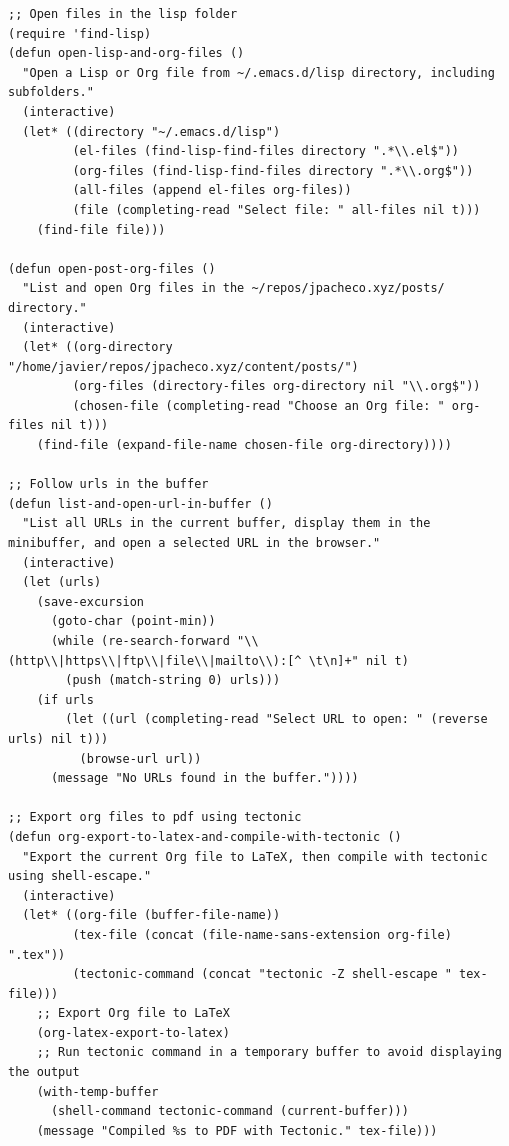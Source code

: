 \documentclass[11pt]{article}
\begin{document}
\begin{verbatim}
;; Open files in the lisp folder
(require 'find-lisp)
(defun open-lisp-and-org-files ()
  "Open a Lisp or Org file from ~/.emacs.d/lisp directory, including subfolders."
  (interactive)
  (let* ((directory "~/.emacs.d/lisp")
         (el-files (find-lisp-find-files directory ".*\\.el$"))
         (org-files (find-lisp-find-files directory ".*\\.org$"))
         (all-files (append el-files org-files))
         (file (completing-read "Select file: " all-files nil t)))
    (find-file file)))

(defun open-post-org-files ()
  "List and open Org files in the ~/repos/jpacheco.xyz/posts/ directory."
  (interactive)
  (let* ((org-directory "/home/javier/repos/jpacheco.xyz/content/posts/")
         (org-files (directory-files org-directory nil "\\.org$"))
         (chosen-file (completing-read "Choose an Org file: " org-files nil t)))
    (find-file (expand-file-name chosen-file org-directory))))

;; Follow urls in the buffer
(defun list-and-open-url-in-buffer ()
  "List all URLs in the current buffer, display them in the minibuffer, and open a selected URL in the browser."
  (interactive)
  (let (urls)
    (save-excursion
      (goto-char (point-min))
      (while (re-search-forward "\\(http\\|https\\|ftp\\|file\\|mailto\\):[^ \t\n]+" nil t)
        (push (match-string 0) urls)))
    (if urls
        (let ((url (completing-read "Select URL to open: " (reverse urls) nil t)))
          (browse-url url))
      (message "No URLs found in the buffer."))))

;; Export org files to pdf using tectonic
(defun org-export-to-latex-and-compile-with-tectonic ()
  "Export the current Org file to LaTeX, then compile with tectonic using shell-escape."
  (interactive)
  (let* ((org-file (buffer-file-name))
         (tex-file (concat (file-name-sans-extension org-file) ".tex"))
         (tectonic-command (concat "tectonic -Z shell-escape " tex-file)))
    ;; Export Org file to LaTeX
    (org-latex-export-to-latex)
    ;; Run tectonic command in a temporary buffer to avoid displaying the output
    (with-temp-buffer
      (shell-command tectonic-command (current-buffer)))
    (message "Compiled %s to PDF with Tectonic." tex-file)))


\end{verbatim}
\end{document}

